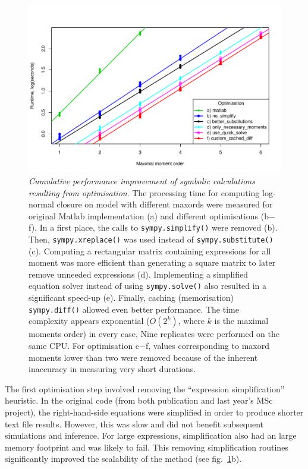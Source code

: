 \begin{figure}[tbh]
\includegraphics[width=0.95\textwidth{}]{mea_speed.pdf}
\caption{\emph{Cumulative performance improvement of symbolic
calculations resulting from optimisation}.
The processing time for computing log-normal closure on \pft{} model with different \gls{maxord}s were measured for original Matlab implementation (a) and different optimisations (b$-$f).
In a first place, the calls to \texttt{sympy.simplify()} were removed (b).
Then, \texttt{sympy.xreplace()} was used instead of \texttt{sympy.substitute()} (c).
Computing a rectangular matrix containing expressions for all moment was more efficient than generating a square matrix to later remove unneeded expressions (d).
Implementing a simplified equation solver instead of using \texttt{sympy.solve()} also resulted in a significant speed-up (e).
Finally, caching (memorisation) \texttt{sympy.diff()} allowed even better performance.
The time complexity appears exponential ($O(2^k)$, where $k$ is the maximal moments order) in every case,
Nine replicates were performed on the same CPU.
For optimisation c$-$f, values corresponding to \gls{maxord} moments lower than two were removed because of
the inherent inaccuracy in measuring very short durations.}
\label{fig:mea_speed}
\end{figure}


The first optimisation step involved removing the ``expression simplification'' heuristic.
In the original code (from both publication\cite{ale_general_2013} and last year's MSc project\cite{babtie_moment_2013}),
the right-hand-side equations were simplified in order to produce shorter text file results.
However, this was slow and did not benefit subsequent simulations and inference.
For large expressions, simplification also had an large memory footprint and was likely to fail.
This removing simplification routines significantly improved the scalability of the method (see fig.~\ref{fig:mea_speed}b).

